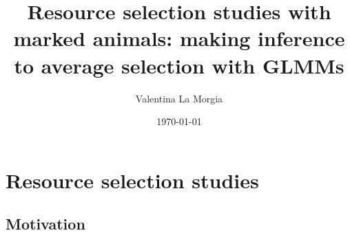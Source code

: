 \documentclass[10pt]{beamer}
\title[Resource selection studies with GLMMs]{Resource selection studies with marked animals: making inference to average selection with GLMMs} %
\author{Valentina La Morgia} %
\institute[ISPRA] %
{
Istituto Superiore per la Protezione e la Ricerca Ambientale \\ %
\medskip
\textit{valentina.lamorgia@unito.it} %
}
\date{\today} %
\begin{document}



\begin{frame}
\titlepage %
\end{frame}



\section{Resource selection studies} %


\subsection{Motivation}
\end{document}
